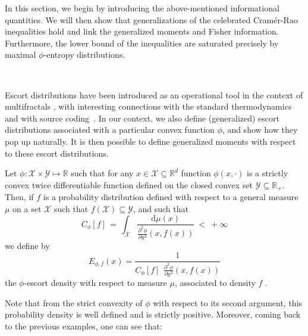 \documentclass[entropy,article,submit,moreauthors,pdftex]{Definitions/mdpi}
\newcommand{\SZ}[1]{{\color{blue} #1}}                                       %
\def\dmu{\mathrm{d}\mu}%
\def\Rset{\mathbb{R}}%
\def\X{\mathcal{X}}%
\def\Y{\mathcal{Y}}%
\begin{document}
In  this section,  we  begin by  introducing  the above-mentioned  informational
quantities.   We  will   then  show  that  generalizations   of  the  celebrated
Cram\'er-Rao  inequalities hold  and  link the  generalized  moments and  Fisher
information.  Furthermore,  the lower  bound of  the inequalities  are saturated
precisely by maximal $\phi$-entropy distributions.

\

Escort distributions have been introduced as  an operational tool in the context
of multifractals  \cite{ChhJen89, BecSch93},  with interesting  connections with
the  standard thermodynamics~\cite{Nau11}  and  with source  coding~\cite{Cam65,
  Ber09}.  In  our context,  we also  define (generalized)  escort distributions
associated with a particular \SZ{convex function  $\phi$}, and show how they pop
up naturally.  It is then possible to define generalized moments with respect to
these escort distributions.


\begin{Definition}\label{def:phi-escort}
  Let $\phi: \X \times  \Y \mapsto \Rset$ such that for any  $x \in \X \subseteq
  \Rset^d$ function  $\phi(x,\cdot)$ is  a strictly convex  twice differentiable
  function defined  on the closed convex  set $\Y \subseteq \Rset_+$.   Then, if
  $f$ is  a probability distribution defined  with respect to a  general measure
  $\mu$ on a set $\X$ such that $f(\X) \subseteq \Y$, \SZ{and} such that
  \begin{equation}
  \label{eq:Cphi}
  C_\phi[f] \, = \, \int_\X \frac{\dmu(x)}{\frac{\partial^2 \phi}{\partial
      y^2}(x,f(x))} \: < \: + \infty
  \end{equation}
  we define by
  \begin{equation}\label{eq:phi-escort}
  E_{\phi,f}(x) = \frac{1}{\displaystyle C_\phi[f] \:\, \frac{\partial^2
    \phi}{\partial y^2}(x,f(x))}
  \end{equation}
  the $\phi$-escort density with respect to measure $\mu$, associated to density
  $f$ .
\end{Definition}
%
Note  that from  the  strict convexity  of  $\phi$ with  respect  to its  second
argument,   this  probability   density  is   well  defined   and  is   strictly
positive. Moreover, coming back to the previous examples, one can see that:
\end{document}
